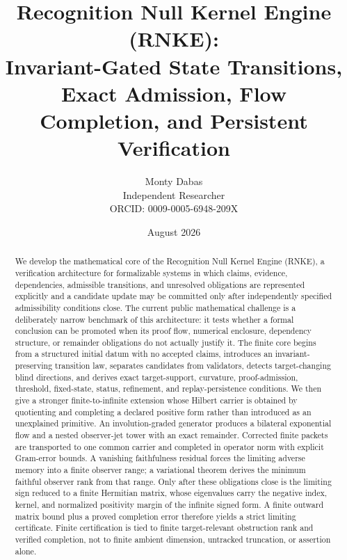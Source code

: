 \documentclass[11pt]{article}
\title{\textbf{Recognition Null Kernel Engine (RNKE):}\\
Invariant-Gated State Transitions, Exact Admission, Flow Completion, and Persistent Verification}
\author{Monty Dabas\\Independent Researcher\\ORCID: 0009-0005-6948-209X}
\date{August 2026}
\begin{document}
\maketitle

\begin{abstract}
We develop the mathematical core of the Recognition Null Kernel Engine (RNKE), a verification architecture for formalizable systems in which claims, evidence, dependencies, admissible transitions, and unresolved obligations are represented explicitly and a candidate update may be committed only after independently specified admissibility conditions close. The current public mathematical challenge is a deliberately narrow benchmark of this architecture: it tests whether a formal conclusion can be promoted when its proof flow, numerical enclosure, dependency structure, or remainder obligations do not actually justify it. The finite core begins from a structured initial datum with no accepted claims, introduces an invariant-preserving transition law, separates candidates from validators, detects target-changing blind directions, and derives exact target-support, curvature, proof-admission, threshold, fixed-state, status, refinement, and replay-persistence conditions. We then give a stronger finite-to-infinite extension whose Hilbert carrier is obtained by quotienting and completing a declared positive form rather than introduced as an unexplained primitive. An involution-graded generator produces a bilateral exponential flow and a nested observer-jet tower with an exact remainder. Corrected finite packets are transported to one common carrier and completed in operator norm with explicit Gram-error bounds. A vanishing faithfulness residual forces the limiting adverse memory into a finite observer range; a variational theorem derives the minimum faithful observer rank from that range. Only after these obligations close is the limiting sign reduced to a finite Hermitian matrix, whose eigenvalues carry the negative index, kernel, and normalized positivity margin of the infinite signed form. A finite outward matrix bound plus a proved completion error therefore yields a strict limiting certificate. Finite certification is tied to finite target-relevant obstruction rank and verified completion, not to finite ambient dimension, untracked truncation, or assertion alone.
\end{abstract}

\tableofcontents
\newpage









\end{document}
